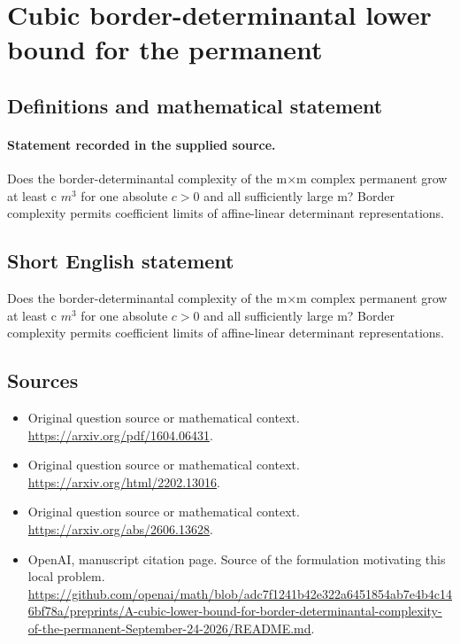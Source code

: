 \documentclass[11pt]{article}
\begin{document}
\section*{Cubic border-determinantal lower bound for the permanent}\label{statement}
\subsection{Definitions and mathematical statement}
\paragraph{Statement recorded in the supplied source.}
Does the border-determinantal complexity of the m×m complex permanent grow at least c $m^{3}$ for one absolute $c>0$ and all sufficiently large m? Border complexity permits coefficient limits of affine-linear determinant representations.
\subsection{Short English statement}
Does the border-determinantal complexity of the m×m complex permanent grow at least c $m^{3}$ for one absolute $c>0$ and all sufficiently large m? Border complexity permits coefficient limits of affine-linear determinant representations.
\subsection{Sources}
\begin{itemize}
\item[S1] Original question source or mathematical context.
\url{https://arxiv.org/pdf/1604.06431}.
\item[S2] Original question source or mathematical context.
\url{https://arxiv.org/html/2202.13016}.
\item[S3] Original question source or mathematical context.
\url{https://arxiv.org/abs/2606.13628}.
\item[S4] OpenAI, manuscript citation page. Source of the formulation motivating this local problem.
\url{https://github.com/openai/math/blob/adc7f1241b42e322a6451854ab7e4b4c146bf78a/preprints/A-cubic-lower-bound-for-border-determinantal-complexity-of-the-permanent-September-24-2026/README.md}.
\end{itemize}
\end{document}
